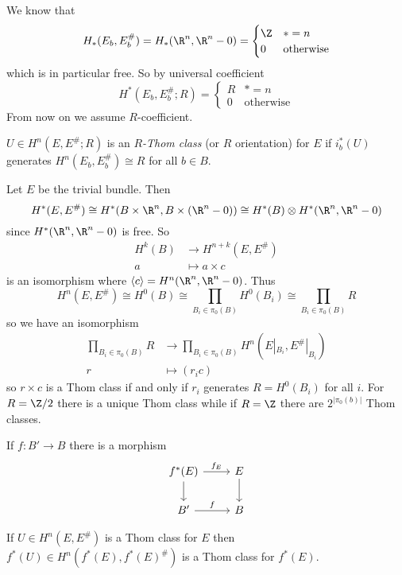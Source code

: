 \documentclass[a4paper]{article}
\begin{document}
We know that
\[
  H_*(E_b, E_b^\#) = H_*(\R^n, \R^n - 0) =
  \begin{cases}
    \Z & * = n \\
    0 & \text{otherwise}
  \end{cases}
\]
which is in particular free. So by universal coefficient
\[
  H^*(E_b, E_b^\#; R) =
  \begin{cases}
    R & * = n \\
    0 & \text{otherwise}
  \end{cases}
\]
From now on we assume \(R\)-coefficient.

\begin{definition}
  \(U \in H^n(E, E^\#; R)\) is an \emph{\(R\)-Thom class} (or \(R\) orientation) for \(E\) if \(i_b^*(U)\) generates \(H^n(E_b, E_b^\#) \cong R\) for all \(b \in B\).
\end{definition}

\begin{eg}
  Let \(E\) be the trivial bundle. Then
  \[
    H^*(E, E^\#) \cong H^*(B \times \R^n, B \times (\R^n - 0)) \cong H^*(B) \otimes H^*(\R^n, \R^n - 0)
  \]
  since \(H^*(\R^n, \R^n - 0)\) is free. So
  \begin{align*}
    H^k(B) &\to H^{n + k}(E, E^\#) \\
    a &\mapsto a \times c
  \end{align*}
  is an isomorphism where \(\langle c \rangle = H^n(\R^n, \R^n - 0)\). Thus
  \[
    H^n(E, E^\#) \cong H^0(B) \cong \prod_{B_i \in \pi_0(B)} H^0(B_i) \cong \prod_{B_i \in \pi_0(B)} R
  \]
  so we have an isomorphism
  \begin{align*}
    \prod_{B_i \in \pi_0(B)} R &\to \prod_{B_i \in \pi_0(B)} H^n(E|_{B_i}, E^\#|_{B_i}) \\
    r &\mapsto (r_ic)
  \end{align*}
  so \(r \times c\) is a Thom class if and only if \(r_i\) generates \(R = H^0(B_i)\) for all \(i\). For \(R = \Z/2\) there is a unique Thom class while if \(R = \Z\) there are \(2^{|\pi_0(b)|}\) Thom classes.
\end{eg}

If \(f: B' \to B\) there is a morphism
\[
  \begin{tikzcd}
    f^*(E) \ar[r, "f_E"] \ar[d] & E \ar[d] \\
    B' \ar[r, "f"] & B
  \end{tikzcd}
\]

\begin{lemma}
  If \(U \in H^n(E, E^\#)\) is a Thom class for \(E\) then \(f^*(U) \in H^n(f^*(E), f^*(E)^\#)\) is a Thom class for \(f^*(E)\).
\end{lemma}
\end{document}
